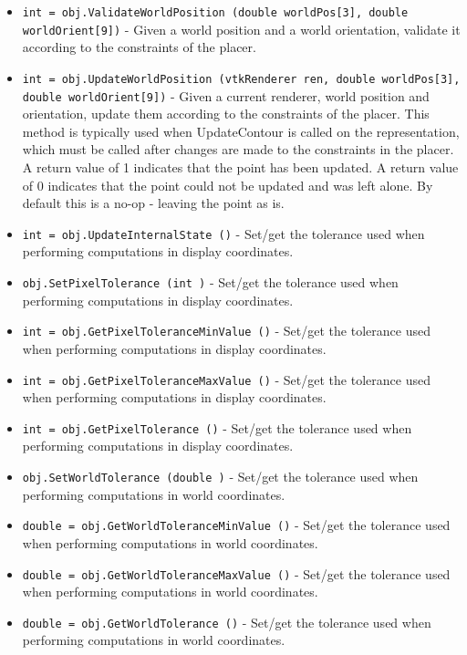 \begin{itemize}
\item  \verb|int = obj.ValidateWorldPosition (double worldPos[3], double worldOrient[9])| -  Given a world position and a world orientation,
 validate it according to the constraints of the placer.

\item  \verb|int = obj.UpdateWorldPosition (vtkRenderer ren, double worldPos[3], double worldOrient[9])| -  Given a current renderer, world position and orientation,
 update them according to the constraints of the placer.
 This method is typically used when UpdateContour is called
 on the representation, which must be called after changes
 are made to the constraints in the placer. A return 
 value of 1 indicates that the point has been updated. A
 return value of 0 indicates that the point could not
 be updated and was left alone. By default this is a no-op - 
 leaving the point as is.

\item  \verb|int = obj.UpdateInternalState ()| -  Set/get the tolerance used when performing computations
 in display coordinates.

\item  \verb|obj.SetPixelTolerance (int )| -  Set/get the tolerance used when performing computations
 in display coordinates.

\item  \verb|int = obj.GetPixelToleranceMinValue ()| -  Set/get the tolerance used when performing computations
 in display coordinates.

\item  \verb|int = obj.GetPixelToleranceMaxValue ()| -  Set/get the tolerance used when performing computations
 in display coordinates.

\item  \verb|int = obj.GetPixelTolerance ()| -  Set/get the tolerance used when performing computations
 in display coordinates.

\item  \verb|obj.SetWorldTolerance (double )| -  Set/get the tolerance used when performing computations
 in world coordinates.

\item  \verb|double = obj.GetWorldToleranceMinValue ()| -  Set/get the tolerance used when performing computations
 in world coordinates.

\item  \verb|double = obj.GetWorldToleranceMaxValue ()| -  Set/get the tolerance used when performing computations
 in world coordinates.

\item  \verb|double = obj.GetWorldTolerance ()| -  Set/get the tolerance used when performing computations
 in world coordinates.

\end{itemize}
